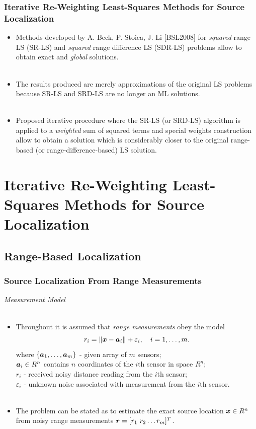 \documentclass [t] {beamer} %
\begin{document}
\begin{frame} %
\frametitle{Iterative Re-Weighting Least-Squares Methods for Source
Localization}
\phantom{m}
\begin{itemize}
\item
Methods developed by A. Beck, P. Stoica, J. Li [BSL2008] for \textit{squared} range LS (SR-LS) and \textit{squared} range difference LS (SDR-LS) problems allow to obtain exact and \textit{global}  solutions.
\\~\\
\item
The results produced are merely approximations of the original LS
problems because SR-LS and SRD-LS are no longer an ML solutions.
\\~\\
\item
Proposed iterative procedure where the SR-LS (or SRD-LS) algorithm is applied to a \textit{weighted} sum of squared terms and special weights construction allow to obtain a solution which is considerably closer to
the original range-based (or range-difference-based) LS solution.
\end{itemize}
\end{frame}




\section[Chapter 2]{Iterative Re-Weighting Least-Squares Methods for Source Localization}

\subsection{Range-Based Localization} %

\begin{frame} %
\frametitle{Source Localization From Range Measurements}
{\large \textit{Measurement Model}} \\~\\
\normalsize
\begin{itemize}
\item 
Throughout it is assumed that \textit{range measurements} obey the model
\begin{equation} 
\nonumber
r_i = \|{\mbox{\boldmath$x$}} - {\mbox{\boldmath$a$}}_i\| + \varepsilon_i, \quad i = 1, \ldots , m.
\end{equation}  
where $\{\mbox{\boldmath$a$}_1,\ldots, \mbox{\boldmath$a$}_m\}$ - given array of $m$ sensors;\\
$\mbox{\boldmath$a$}_i\in R^n$  contains $n$ coordinates of the $i$th sensor in space $R^n$; \\
$r_i$ - received noisy distance reading from the $i$th sensor; \\
$\varepsilon_i$ - unknown noise associated with measurement from the $i$th sensor. 
\\~\\
\item
The problem can be stated as to estimate the exact source location $\mbox{\boldmath$x$} \in R^n$ from noisy range measurements $\mbox{\boldmath$r$} = [r_1 \ r_2 \ldots r_m]^T$.
\end{itemize}
\end{frame}
\end{document}
